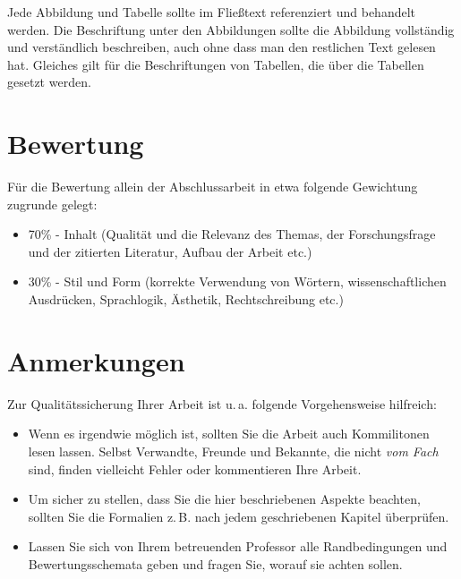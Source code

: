 \documentclass[conference,final,a4paper]{IEEEtran}
\begin{document}
Jede Abbildung und Tabelle sollte im Fließtext referenziert und behandelt werden. Die Beschriftung unter den Abbildungen sollte die Abbildung vollständig und verständlich beschreiben, auch ohne dass man den restlichen Text gelesen hat. Gleiches gilt für die Beschriftungen von Tabellen, die über die Tabellen gesetzt werden.

\section{Bewertung}
Für die Bewertung allein der Abschlussarbeit in etwa folgende Gewichtung zugrunde gelegt:
\begin{itemize}
\item 70\% - Inhalt (Qualität und die Relevanz des Themas, der Forschungsfrage und der zitierten Literatur, Aufbau der Arbeit  etc.)
\item 30\% - Stil und Form (korrekte Verwendung von Wörtern, wissenschaftlichen Ausdrücken, Sprachlogik, Ästhetik, Rechtschreibung etc.)
\end{itemize}

\section{Anmerkungen}
Zur Qualitätssicherung Ihrer Arbeit ist u.\,a. folgende Vorgehensweise hilfreich:
\begin{itemize}
\item Wenn es irgendwie möglich ist, sollten Sie die Arbeit auch Kommilitonen lesen lassen. Selbst Verwandte, Freunde und Bekannte, die nicht \emph{vom Fach} sind, finden vielleicht Fehler oder kommentieren Ihre Arbeit.
\item Um sicher zu stellen, dass Sie die hier beschriebenen Aspekte beachten, sollten Sie die Formalien z.\,B. nach jedem geschriebenen Kapitel überprüfen.
\item Lassen Sie sich von Ihrem betreuenden Professor alle Randbedingungen und Bewertungsschemata geben und fragen Sie, worauf sie achten sollen. 
\end{itemize}



%
%
\end{document}
